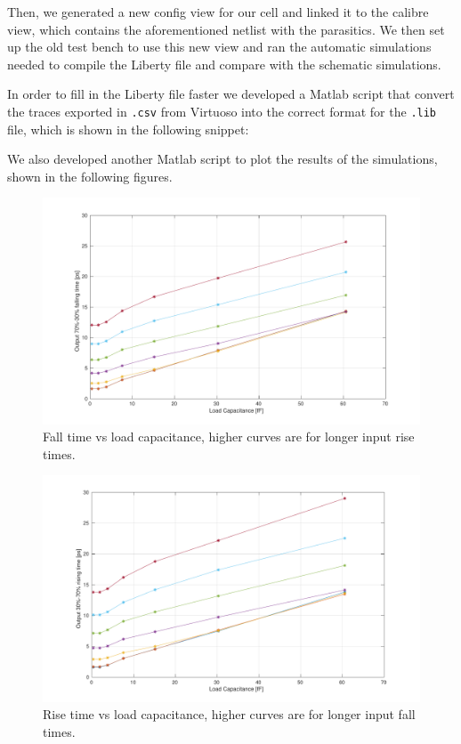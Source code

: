 \documentclass[a4paper]{article}
\begin{document}
Then, we generated a new config view for our cell and linked it to the calibre view, which contains the aforementioned netlist with the parasitics. We then set up the old test bench to use this new view and ran the automatic simulations needed to compile the Liberty file and compare with the schematic simulations. 

In order to fill in the Liberty file faster we developed a Matlab script that convert the traces exported in \texttt{.csv} from Virtuoso into the correct format for the \texttt{.lib} file, which is shown in the following snippet:

We also developed another Matlab script to plot the results of the simulations, shown in the following figures.
\begin{figure}[H]
	\centering
	\includegraphics[width=\linewidth]{../INV_X4/simulations/t_F.pdf}
	\caption{Fall time vs load capacitance, higher curves are for longer input rise times.}
	\label{fig:inv_t_F}
\end{figure}
\begin{figure}[H]
	\centering
	\includegraphics[width=\linewidth]{../INV_X4/simulations/t_R.pdf}
	\caption{Rise time vs load capacitance, higher curves are for longer input fall times.}
	\label{fig:inv_t_R}
\end{figure}
\end{document}
